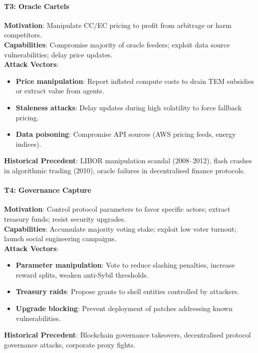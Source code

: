 \documentclass[11pt]{article}
\begin{document}
\paragraph{T3: Oracle Cartels}
\textbf{Motivation}: Manipulate CC/EC pricing to profit from arbitrage or harm competitors.\\
\textbf{Capabilities}: Compromise majority of oracle feeders; exploit data source vulnerabilities; delay price updates.\\
\textbf{Attack Vectors}:
\begin{itemize}[noitemsep]
  \item \textbf{Price manipulation}: Report inflated compute costs to drain TEM subsidies or extract value from agents.
  \item \textbf{Staleness attacks}: Delay updates during high volatility to force fallback pricing.
  \item \textbf{Data poisoning}: Compromise API sources (AWS pricing feeds, energy indices).
\end{itemize}
\textbf{Historical Precedent}: LIBOR manipulation scandal (2008--2012), flash crashes in algorithmic trading (2010), oracle failures in decentralised finance protocols.

\paragraph{T4: Governance Capture}
\textbf{Motivation}: Control protocol parameters to favor specific actors; extract treasury funds; resist security upgrades.\\
\textbf{Capabilities}: Accumulate majority voting stake; exploit low voter turnout; launch social engineering campaigns.\\
\textbf{Attack Vectors}:
\begin{itemize}[noitemsep]
  \item \textbf{Parameter manipulation}: Vote to reduce slashing penalties, increase reward splits, weaken anti-Sybil thresholds.
  \item \textbf{Treasury raids}: Propose grants to shell entities controlled by attackers.
  \item \textbf{Upgrade blocking}: Prevent deployment of patches addressing known vulnerabilities.
\end{itemize}
\textbf{Historical Precedent}: Blockchain governance takeovers, decentralised protocol governance attacks, corporate proxy fights.
\end{document}
